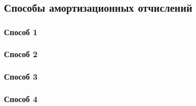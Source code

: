 \chapter{}

\section{Способы амортизационных отчислений}

\subsection{Способ 1}

\subsection{Способ 2}

\subsection{Способ 3}

\subsection{Способ 4}
